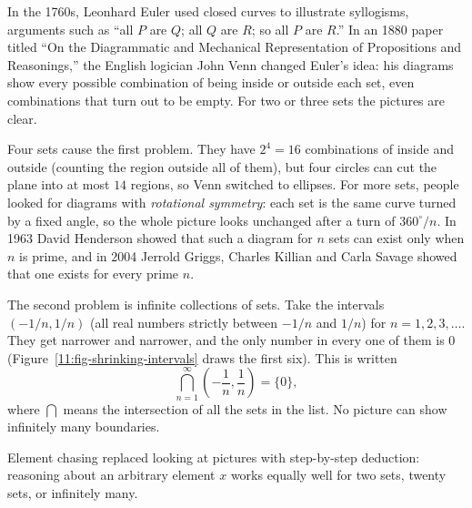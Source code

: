 \begin{historybox}
In the 1760s, Leonhard Euler used closed curves to illustrate syllogisms, arguments such as ``all $P$ are $Q$; all $Q$ are $R$; so all $P$ are $R$.'' In an 1880 paper titled ``On the Diagrammatic and Mechanical Representation of Propositions and Reasonings,'' the English logician John Venn changed Euler's idea: his diagrams show every possible combination of being inside or outside each set, even combinations that turn out to be empty. For two or three sets the pictures are clear.

Four sets cause the first problem. They have $2^4 = 16$ combinations of inside and outside (counting the region outside all of them), but four circles can cut the plane into at most $14$ regions, so Venn switched to ellipses. For more sets, people looked for diagrams with \emph{rotational symmetry}: each set is the same curve turned by a fixed angle, so the whole picture looks unchanged after a turn of $360^\circ/n$. In 1963 David Henderson showed that such a diagram for $n$ sets can exist only when $n$ is prime, and in 2004 Jerrold Griggs, Charles Killian and Carla Savage showed that one exists for every prime $n$.

The second problem is infinite collections of sets. Take the intervals $(-1/n, 1/n)$ (all real numbers strictly between $-1/n$ and $1/n$) for $n = 1, 2, 3, \dots$. They get narrower and narrower, and the only number in every one of them is $0$ (Figure~\ref{11:fig-shrinking-intervals} draws the first six). This is written
\[
\bigcap_{n=1}^{\infty} \left( -\frac{1}{n}, \frac{1}{n} \right) = \{0\},
\]
where $\bigcap$ means the intersection of all the sets in the list. No picture can show infinitely many boundaries.

Element chasing replaced looking at pictures with step-by-step deduction: reasoning about an arbitrary element $x$ works equally well for two sets, twenty sets, or infinitely many.
\end{historybox}

